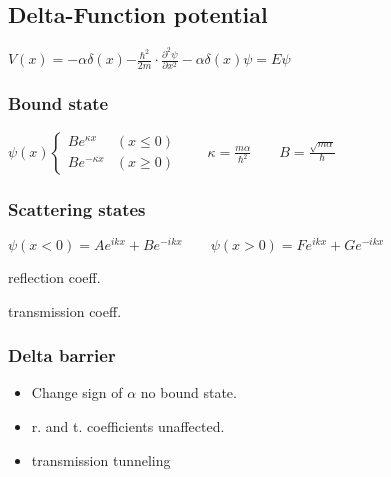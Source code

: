 \documentclass[10pt,a4paper]{scrartcl}
\begin{document}
\begin{multicols*}{3}
	\subsection{Delta-Function potential}
	
	$V(x)=-\alpha \delta(x)$\hfill$-\frac{\hbar^2}{2m}\cdot\frac{\partial^2\psi}{\partial x^2}-\alpha\delta(x)\psi=E\psi$
	
	\subsubsection{Bound state}
	
	$\psi(x)\begin{cases}Be^{\kappa x}&(x\leq 0)\\Be^{-\kappa x}&(x\geq 0)\end{cases}\qquad \kappa=\frac{m\alpha}{\hbar^2}\qquad B=\frac{\sqrt{m\alpha}}{\hbar}$
	
	
	\subsubsection{Scattering states}
	
	$\psi(x<0)=Ae^{ikx}+Be^{-ikx}\qquad \psi(x>0)=Fe^{ikx}+Ge^{-ikx}$
	
	
	\begin{center}
	
	 reflection coeff. 
	
	 transmission coeff.
	\end{center}
	
	\subsubsection{Delta barrier}
	
	\begin{itemize}
	\compaq
	\item
	Change sign of $\alpha$ \dahe no bound state.
	\item
	r. and t. coefficients unaffected.
	\item
	transmission \dahe tunneling
	\end{itemize}
	

\end{multicols*}
\end{document}
